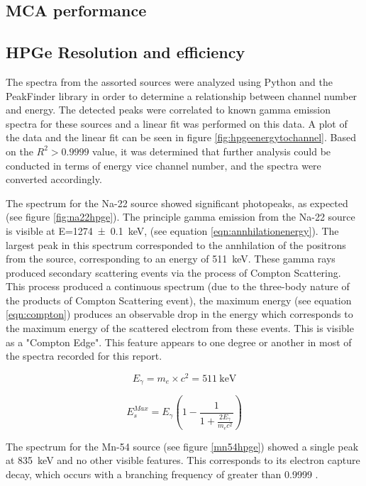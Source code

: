 \documentclass[12pt]{article}
\begin{document}
\subsection{MCA performance}

\subsection{HPGe Resolution and efficiency}
The spectra from the assorted sources were analyzed using Python and the PeakFinder library
in order to determine a relationship between channel number and energy. The detected peaks were correlated to known gamma emission spectra for these sources and a linear fit was performed on this data. A plot of the data and the linear fit can be seen in figure \ref{fig:hpgeenergytochannel}. Based on the $R^2>0.9999$ value, it was determined that further analysis could be conducted in terms of energy vice channel number, and the spectra were converted accordingly.

The spectrum for the Na-22 source showed significant photopeaks, as expected (see figure \ref{fig:na22hpge}). The principle gamma emission from the Na-22 source is visible at E=\SI{1274 \pm 0.1}{\kilo\electronvolt}, (see equation \ref{eqn:annhilationenergy}). The largest peak in this spectrum corresponded to the annhilation of the positrons from the source, corresponding to an energy of \SI{511}{\kilo\electronvolt}. These gamma rays produced secondary scattering events via the process of Compton Scattering. This process produced a continuous spectrum (due to the three-body nature of the products of Compton Scattering event), the maximum energy (see equation \ref{eqn:compton}) produces an observable drop in the energy which corresponds to the maximum energy of the scattered electrom from these events. This is visible as a "Compton Edge". This feature appears to one degree or another in most of the spectra recorded for this report.

\begin{equation}
	\label{eqn:annhilationenergy}
	E_\gamma = m_e \times c^2 = \SI{511}{\kilo\electronvolt}
\end{equation}

\begin{equation}
	\label{eqn:compton}
	E_s^{Max} = E_\gamma \left(1 - \frac{1}{1 + \frac{2E_\gamma}{m_e c^2}} \right)
\end{equation}

The spectrum for the Mn-54 source (see figure \ref{mn54hpge}) showed a single peak at \SI{835}{\kilo\electronvolt} and no other visible features. This corresponds to its electron capture decay, which occurs with a branching frequency of greater than 0.9999
.
\end{document}
